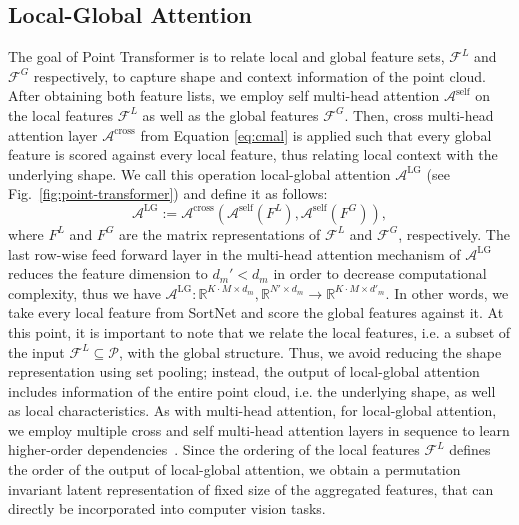 \documentclass{ieeeaccess}
\begin{document}
\subsection{Local-Global Attention}
The goal of Point Transformer is to relate local and global feature sets, $\mathcal{F}^{L} $ and $\mathcal{F}^{G}$ respectively, to capture shape and context information of the point cloud.
After obtaining both feature lists, we employ self multi-head attention $\mathcal{A}^{\text{self}}$ on the local features $\mathcal{F}^L$ as well as the global features $\mathcal{F}^G$.
Then, cross multi-head attention layer $\mathcal{A}^{\text{cross}}$ from Equation \eqref{eq:cmal} is applied such that every global feature is scored against every local feature, thus relating local context with the underlying shape. We call this operation local-global attention $\mathcal{A}^{\text{LG}}$ (see Fig.~\ref{fig:point-transformer}) and define it as follows:
\begin{equation}
    \mathcal{A}^{\text{LG}} := \mathcal{A}^{\text{cross}} ( \mathcal{A}^{\text{self}} (F^L) , \mathcal{A}^{\text{self}} (F^G) ),
\end{equation}
where $F^L$ and $F^G$ are the matrix representations of $\mathcal{F}^L$ and $\mathcal{F}^G$, respectively. The last row-wise feed forward layer in the multi-head attention mechanism of $\mathcal{A}^{\text{LG}}$ reduces the feature dimension to $d_m' < d_m$ in order to decrease computational complexity, thus we have 
\mbox{$\mathcal{A}^{\text{LG}} : \mathbb{R}^{K\cdot M\times d_{m}}, \mathbb{R}^{N'\times d_{m}} \rightarrow \mathbb{R}^{K\cdot M\times d'_{m}}$.} 
In other words, we take every local feature from SortNet and score the global features against it. 
At this point, it is important to note that we relate the local features, i.e. a subset of the input $\mathcal{F}^L \subseteq \mathcal{P}$, with the global structure. Thus, we avoid reducing the shape representation using set pooling; instead, the output of local-global attention includes information of the entire point cloud, i.e. the underlying shape, as well as local characteristics.
As with multi-head attention, for local-global attention, we employ multiple cross and self multi-head attention layers in sequence to learn higher-order dependencies~\cite{vaswani2017attention}. Since the ordering of the local features $\mathcal{F}^L$ defines the order of the output of local-global attention, we obtain a permutation invariant latent representation of fixed size of the aggregated features, that can directly be incorporated into computer vision tasks. 
\end{document}
